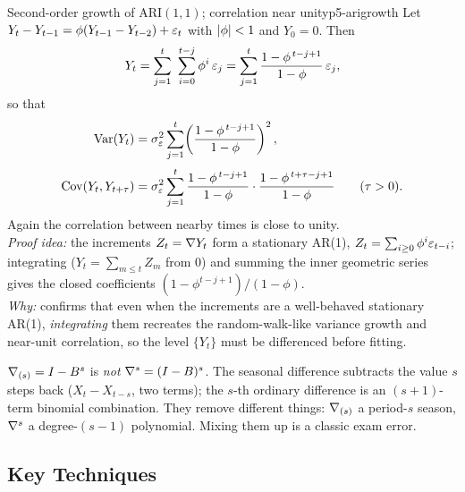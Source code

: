 \begin{theorem}{Second-order growth of ARI$(1,1)$; correlation near unity}{p5-arigrowth}
Let $Y_t-Y_{t-1}=\phi(Y_{t-1}-Y_{t-2})+\varepsilon_t$ with $\left\lvert \phi \right\rvert<1$ and $Y_0=0$.
Then
\[
Y_t=\sum_{j=1}^{t}\ \sum_{i=0}^{t-j}\phi^{i}\,\eps_j
=\sum_{j=1}^{t}\frac{1-\phi^{\,t-j+1}}{1-\phi}\,\eps_j ,
\]
so that
\[
\begin{aligned}
\operatorname{Var}(Y_t)&=\sigma_\varepsilon^2\sum_{j=1}^{t}\!\left(\frac{1-\phi^{\,t-j+1}}{1-\phi}\right)^{2},\\[2pt]
\operatorname{Cov}(Y_t,Y_{t+\tau})&=\sigma_\varepsilon^2\sum_{j=1}^{t}
\frac{1-\phi^{\,t-j+1}}{1-\phi}\cdot\frac{1-\phi^{\,t+\tau-j+1}}{1-\phi}
\qquad (\tau>0).
\end{aligned}
\]
Again the correlation between nearby times is close to unity.\\[2pt]
\textit{Proof idea:} the increments $Z_t=\nabla Y_t$ form a stationary AR(1),
$Z_t=\sum_{i\ge0}\phi^{i}\varepsilon_{t-i}$; integrating ($Y_t=\sum_{m\le t}Z_m$ from
$0$) and summing the inner geometric series gives the closed coefficients
$(1-\phi^{t-j+1})/(1-\phi)$.\\
\textit{Why:} confirms that even when the increments are a well-behaved
stationary AR(1), \emph{integrating} them recreates the random-walk-like
variance growth and near-unit correlation, so the level $\{Y_t\}$ must be
differenced before fitting.
\end{theorem}

\begin{pitfall}
$\nabla_{(s)}=I-B^{s}$ is \emph{not} $\nabla^{s}=(I-B)^{s}$. The seasonal
difference subtracts the value $s$ steps back ($X_t-X_{t-s}$, two terms); the
$s$-th ordinary difference is an $(s+1)$-term binomial combination. They remove
different things: $\nabla_{(s)}$ a period-$s$ season, $\nabla^{s}$ a degree-$(s-1)$
polynomial. Mixing them up is a classic exam error.
\end{pitfall}

\subsection{Key Techniques}

